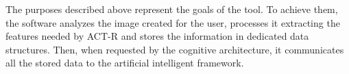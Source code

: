 	
	The purposes described above represent the goals of the tool.
	To achieve them, the software analyzes the image created for the user, processes it extracting the features needed by ACT-R and stores the information in dedicated data structures. Then, when requested by the cognitive architecture, it communicates all the stored data to the artificial intelligent framework. 
	


